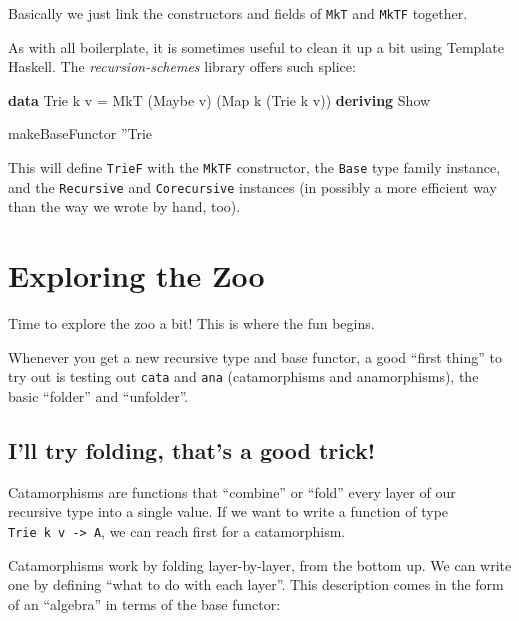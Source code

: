 \documentclass[]{article}
\newenvironment{Shaded}{}{}
\newcommand{\DataTypeTok}[1]{\textcolor[rgb]{0.56,0.13,0.00}{#1}}
\newcommand{\FunctionTok}[1]{\textcolor[rgb]{0.02,0.16,0.49}{#1}}
\newcommand{\KeywordTok}[1]{\textcolor[rgb]{0.00,0.44,0.13}{\textbf{#1}}}
\newcommand{\NormalTok}[1]{#1}
\begin{document}
Basically we just link the constructors and fields of \texttt{MkT} and
\texttt{MkTF} together.

As with all boilerplate, it is sometimes useful to clean it up a bit using
Template Haskell. The \emph{recursion-schemes} library offers such splice:

\begin{Shaded}
\begin{Highlighting}[]
\KeywordTok{data} \DataTypeTok{Trie}\NormalTok{ k v }\FunctionTok{=} \DataTypeTok{MkT}\NormalTok{ (}\DataTypeTok{Maybe}\NormalTok{ v) (}\DataTypeTok{Map}\NormalTok{ k (}\DataTypeTok{Trie}\NormalTok{ k v))}
  \KeywordTok{deriving} \DataTypeTok{Show}

\NormalTok{makeBaseFunctor ''}\DataTypeTok{Trie}
\end{Highlighting}
\end{Shaded}

This will define \texttt{TrieF} with the \texttt{MkTF} constructor, the
\texttt{Base} type family instance, and the \texttt{Recursive} and
\texttt{Corecursive} instances (in possibly a more efficient way than the way we
wrote by hand, too).

\hypertarget{exploring-the-zoo}{%
\section{Exploring the Zoo}\label{exploring-the-zoo}}

Time to explore the zoo a bit! This is where the fun begins.

Whenever you get a new recursive type and base functor, a good ``first thing''
to try out is testing out \texttt{cata} and \texttt{ana} (catamorphisms and
anamorphisms), the basic ``folder'' and ``unfolder''.

\hypertarget{ill-try-folding-thats-a-good-trick}{%
\subsection{I'll try folding, that's a good
trick!}\label{ill-try-folding-thats-a-good-trick}}

Catamorphisms are functions that ``combine'' or ``fold'' every layer of our
recursive type into a single value. If we want to write a function of type
\texttt{Trie\ k\ v\ -\textgreater{}\ A}, we can reach first for a catamorphism.

Catamorphisms work by folding layer-by-layer, from the bottom up. We can write
one by defining ``what to do with each layer''. This description comes in the
form of an ``algebra'' in terms of the base functor:
\end{document}
